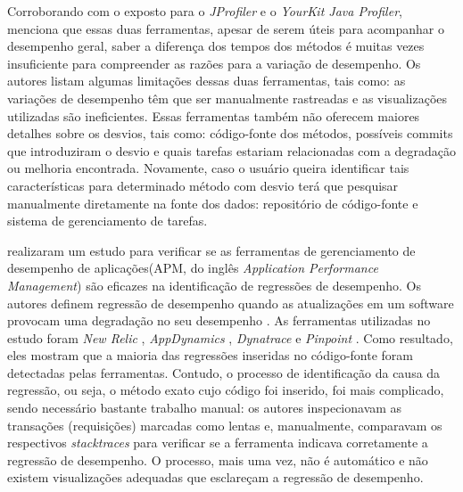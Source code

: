 Corroborando com o exposto para o \textit{JProfiler} e o \textit{YourKit Java Profiler}, \citeauthor{SandovalAlcocer2013} menciona que essas duas ferramentas, apesar de serem úteis para acompanhar o desempenho geral, saber a diferença dos tempos dos métodos é muitas vezes insuficiente para compreender as razões para a variação de desempenho. Os autores listam algumas limitações dessas duas ferramentas, tais como: as variações de desempenho têm que ser manualmente rastreadas e as visualizações utilizadas são ineficientes. Essas ferramentas também não oferecem maiores detalhes sobre os desvios, tais como: código-fonte dos métodos, possíveis commits que introduziram o desvio e quais tarefas estariam relacionadas com a degradação ou melhoria encontrada. Novamente, caso o usuário queira identificar tais características para determinado método com desvio terá que pesquisar manualmente diretamente na fonte dos dados: repositório de código-fonte e sistema de gerenciamento de tarefas.

\citeauthor{Ahmed2016} realizaram um estudo para verificar se as ferramentas de gerenciamento de desempenho de aplicações(APM, do inglês \textit{Application Performance Management}) são eficazes na identificação de regressões de desempenho. Os autores definem regressão de desempenho quando as atualizações em um software provocam uma degradação no seu desempenho \cite{Ahmed2016}. As ferramentas utilizadas no estudo foram \textit{New Relic} \cite{Relic2016}, \textit{AppDynamics} \cite{Appdynamics}, \textit{Dynatrace} \cite{Dynatrace2016} e \textit{Pinpoint} \cite{Pinpoint2016}. Como resultado, eles mostram que a maioria das regressões inseridas no código-fonte foram detectadas pelas ferramentas. Contudo, o processo de identificação da causa da regressão, ou seja, o método exato cujo código foi inserido, foi mais complicado, sendo necessário bastante trabalho manual: os autores inspecionavam as transações (requisições) marcadas como lentas e, manualmente, comparavam os respectivos \textit{stacktraces} para verificar se a ferramenta indicava corretamente a regressão de desempenho. O processo, mais uma vez, não é automático e não existem visualizações adequadas que esclareçam a regressão de desempenho.


